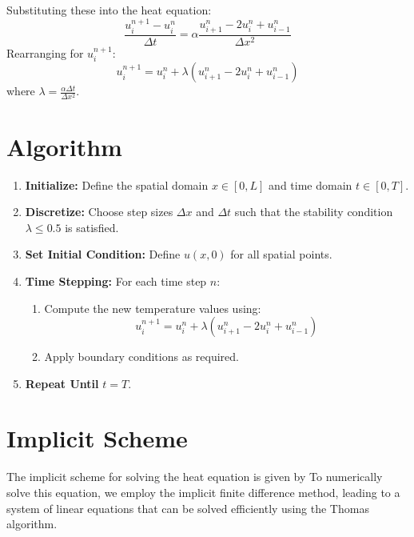 \documentclass[12pt]{article}
\begin{document}
Substituting these into the heat equation:
\begin{equation}
    \frac{u_i^{n+1} - u_i^n}{\Delta t} = \alpha \frac{u_{i+1}^n - 2u_i^n + u_{i-1}^n}{\Delta x^2}
\end{equation}
Rearranging for \( u_i^{n+1} \):
\begin{equation}
    u_i^{n+1} = u_i^n + \lambda \left( u_{i+1}^n - 2u_i^n + u_{i-1}^n \right)
\end{equation}
where \( \lambda = \frac{\alpha \Delta t}{\Delta x^2} \).

\section{Algorithm}
\begin{enumerate}
    \item \textbf{Initialize:} Define the spatial domain \( x \in [0, L] \) and time domain \( t \in [0, T] \).
    \item \textbf{Discretize:} Choose step sizes \( \Delta x \) and \( \Delta t \) such that the stability condition \( \lambda \leq 0.5 \) is satisfied.
    \item \textbf{Set Initial Condition:} Define \( u(x,0) \) for all spatial points.
    \item \textbf{Time Stepping:} For each time step \( n \):
    \begin{enumerate}
        \item Compute the new temperature values using:
        \begin{equation}
            u_i^{n+1} = u_i^n + \lambda \left( u_{i+1}^n - 2u_i^n + u_{i-1}^n \right)
        \end{equation}
        \item Apply boundary conditions as required.
    \end{enumerate}
    \item \textbf{Repeat Until} \( t = T \).
\end{enumerate}



\section{Implicit Scheme}
The implicit scheme for solving the heat equation is given by
To numerically solve this equation, we employ the implicit finite difference method, leading to a system of linear equations that can be solved efficiently using the Thomas algorithm.
\end{document}
